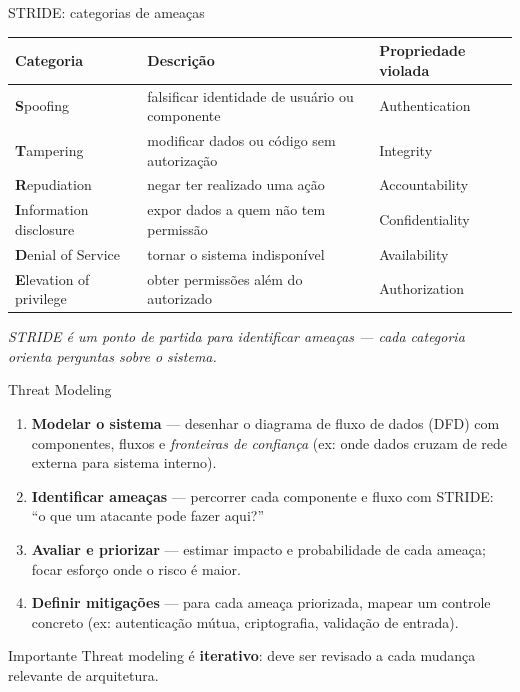 \documentclass{beamer}
\begin{document}
\begin{frame}{STRIDE: categorias de ameaças}
\footnotesize
\begin{tabular}{p{2.4cm} p{4.8cm} p{3.0cm}}
\toprule
\textbf{Categoria} & \textbf{Descrição} & \textbf{Propriedade violada}\\
\midrule
\textbf{S}poofing & falsificar identidade de usuário ou componente & Authentication\\
\textbf{T}ampering & modificar dados ou código sem autorização & Integrity\\
\textbf{R}epudiation & negar ter realizado uma ação & Accountability\\
\textbf{I}nformation disclosure & expor dados a quem não tem permissão & Confidentiality\\
\textbf{D}enial of Service & tornar o sistema indisponível & Availability\\
\textbf{E}levation of privilege & obter permissões além do autorizado & Authorization\\
\bottomrule
\end{tabular}

\vspace{0.4em}
\small
\textit{STRIDE é um ponto de partida para identificar ameaças — cada categoria orienta perguntas sobre o sistema.}
\end{frame}

\begin{frame}{Threat Modeling}

\begin{enumerate}
  \item \textbf{Modelar o sistema} — desenhar o diagrama de fluxo de dados (DFD) com componentes, fluxos e \textit{fronteiras de confiança} (ex: onde dados cruzam de rede externa para sistema interno).

  \vspace{0.3em}
  \item \textbf{Identificar ameaças} — percorrer cada componente e fluxo com STRIDE: ``o que um atacante pode fazer aqui?''

  \vspace{0.3em}
  \item \textbf{Avaliar e priorizar} — estimar impacto e probabilidade de cada ameaça; focar esforço onde o risco é maior.

  \vspace{0.3em}
  \item \textbf{Definir mitigações} — para cada ameaça priorizada, mapear um controle concreto (ex: autenticação mútua, criptografia, validação de entrada).
\end{enumerate}

\vspace{0.3em}
\begin{block}{Importante}
Threat modeling é \textbf{iterativo}: deve ser revisado a cada mudança relevante de arquitetura.
\end{block}
\end{frame}
\end{document}
